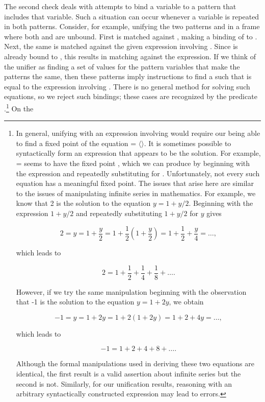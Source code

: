 The second check deals with attempts to bind a variable to a pattern that
includes that variable.  Such a situation can occur whenever a variable is
repeated in both patterns.  Consider, for example, unifying the two patterns
 and  in a
frame where both  and  are unbound.  First  is
matched against , making a binding of  to .  Next,
the same  is matched against the given expression involving .
Since  is already bound to , this results in matching
 against the expression.  If we think of the unifier as finding a set
of values for the pattern variables that make the patterns the same, then these
patterns imply instructions to find a  such that  is equal to
the expression involving .  There is no general method for solving
such equations, so we reject such bindings; these cases are recognized by the
predicate .\footnote{In general, unifying  with an
expression involving  would require our being able to find a fixed
point of the equation  = \( \langle \)\( \rangle \).  It
is sometimes possible to syntactically form an expression that appears to be
the solution.  For example,  =  seems to have the fixed
point , which we can produce by beginning with the
expression  and repeatedly substituting  for
.  Unfortunately, not every such equation has a meaningful fixed
point.  The issues that arise here are similar to the issues of manipulating
infinite series in mathematics.  For example, we know that 2 is the solution to
the equation \( y = 1 + y / 2 \).  Beginning with the expression \( 1 + y / 2 \)
and repeatedly substituting \( 1 + y / 2 \) for \( y \) gives

$$ 2 = y = 1 + \frac{y}{2} = 1 + \frac{1}{2}\left(1 + \frac{y}{2}\right) =
	1 + \frac{1}{2} + \frac{y}{4} = \dots , $$

\noindent
which leads to

$$ 2 = 1 + \frac{1}{2} + \frac{1}{4} + \frac{1}{8} + \dots. $$

\noindent
However, if we try the same manipulation beginning with the observation that -1
is the solution to the equation \( y = 1 + 2y \), we obtain

$$ -1 = y = 1 + 2y = 1 + 2(1 + 2y) = 1 + 2 + 4y = \dots, $$

\noindent
which leads to

$$ -1 = 1 + 2 + 4 + 8 + \dots. $$

\noindent
Although the formal manipulations used in deriving these two equations are
identical, the first result is a valid assertion about infinite series but the
second is not.  Similarly, for our unification results, reasoning with an
arbitrary syntactically constructed expression may lead to errors.}  On the
